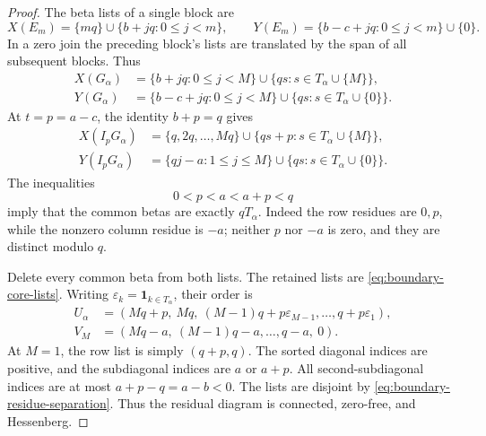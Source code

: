 \documentclass[11pt,a4paper]{amsart}
\numberwithin{equation}{section}
\theoremstyle{plain}
\theoremstyle{definition}
\begin{document}
\begin{proof}
The beta lists of a single block are
\[
 X(E_m)=\{mq\}\cup\{b+jq:0\le j<m\},\qquad
 Y(E_m)=\{b-c+jq:0\le j<m\}\cup\{0\}.
\]
In a zero join the preceding block's lists are translated by the span
of all subsequent blocks.  Thus
\begin{equation}\label{eq:thin-beta-lists}
 \begin{aligned}
 X(G_\alpha)&=\{b+jq:0\le j<M\}
       \cup\{qs:s\in T_\alpha\cup\{M\}\},\\
 Y(G_\alpha)&=\{b-c+jq:0\le j<M\}
       \cup\{qs:s\in T_\alpha\cup\{0\}\}.
 \end{aligned}
\end{equation}
At \(t=p=a-c\), the identity \(b+p=q\) gives
\begin{equation}\label{eq:boundary-beta-lists}
 \begin{aligned}
 X(I_pG_\alpha)&=\{q,2q,\ldots,Mq\}
       \cup\{qs+p:s\in T_\alpha\cup\{M\}\},\\
 Y(I_pG_\alpha)&=\{qj-a:1\le j\le M\}
       \cup\{qs:s\in T_\alpha\cup\{0\}\}.
 \end{aligned}
\end{equation}
The inequalities
\begin{equation}\label{eq:boundary-residue-separation}
 0<p<a<a+p<q
\end{equation}
imply that the common betas are exactly \(qT_\alpha\).
Indeed the row residues are \(0,p\), while the nonzero column
residue is \(-a\); neither \(p\) nor \(-a\) is zero, and they
are distinct modulo \(q\).

Delete every common beta from both lists.  The retained lists are
\eqref{eq:boundary-core-lists}.  Writing
\(\varepsilon_k=\mathbf1_{k\in T_\alpha}\), their order is
\begin{equation}\label{eq:boundary-core-ordered}
 \begin{aligned}
 U_\alpha&=(Mq+p,\ Mq,\ (M-1)q+p\varepsilon_{M-1},
                  \ldots,q+p\varepsilon_1),\\
 V_M&=(Mq-a,\ (M-1)q-a,\ldots,q-a,\ 0).
 \end{aligned}
\end{equation}
At \(M=1\), the row list is simply \((q+p,q)\).
The sorted diagonal indices are positive, and the subdiagonal indices
are \(a\) or \(a+p\).  All second-subdiagonal indices are at most
\(a+p-q=a-b<0\).  The lists are disjoint by
\eqref{eq:boundary-residue-separation}.  Thus the residual diagram is
connected, zero-free, and Hessenberg.


\end{proof}
\end{document}
